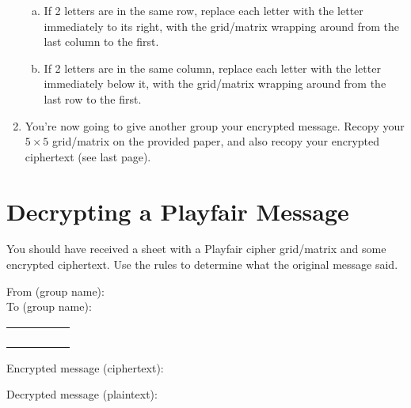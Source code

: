 \documentclass[12pt]{amsart}
\theoremstyle{plain}
\theoremstyle{definition}
\theoremstyle{remark}
\begin{document}
\begin{enumerate}[1.]
\begin{enumerate}[a.]
			\item If 2 letters are in the same row, replace each letter with the letter immediately to its right, with the grid/matrix wrapping around from the last column to the first.\\
			\item If 2 letters are in the same column, replace each letter with the letter immediately below it, with the grid/matrix wrapping around from the last row to the first.\\
		\end{enumerate}
		\vspace{1.5in}
	\item You're now going to give another group your encrypted message.  Recopy your $5 \times 5$ grid/matrix on the provided paper, and also recopy your encrypted ciphertext (see last page).\\
\end{enumerate}

\section{Decrypting a Playfair Message}
You should have received a sheet with a Playfair cipher grid/matrix and some encrypted ciphertext.  Use the rules to determine what the original message said.

\newpage
From (group name): \underline{\hspace{3in}}\\

To (group name):   \underline{\hspace{3in}}\\
	\begin{center}
		\begin{tabular}{|p{.5in}|p{.5in}|p{.5in}|p{.5in}|p{.5in}|} \hline
		&&&&\\\hline
		&&&&\\\hline
		&&&&\\\hline
		&&&&\\\hline
		&&&&\\ \hline
		\end{tabular}
	\end{center}
	
Encrypted message (ciphertext):\\ \vspace{2.5in}

Decrypted message (plaintext):
\end{document}
